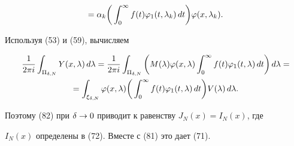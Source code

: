 \begin{pf}
\begin{multline*}
%


=\al _k\bigg(\int_0^\iy f(t)\vv_1(t,\la_k)\,dt\bigg)\vv(x,\la_k).


\end{multline*}


Используя (53) и (59), вычисляем


\begin{multline*}


\frac 1{2\pi i}\int_{\Pi_{\de,N}} Y(x,\la)\,d\la=


\frac 1{2\pi i}\int_{\Pi_{\de,N}}\bigg(M(\la)\vv(x,\la)


\int_0^\iy f(t)\vv_1(t,\la)\,dt\bigg)\,d\la = \\


%


=\int_{\xi_{\de,N}}


\vv(x,\la)\bigg(\int_0^\iy f(t)\vv_1(t,\la)\,dt\bigg)V(\la)\,d\la.


\end{multline*}


Поэтому (82) при $\delta\to 0$ приводит к равенству $J_N(x)=I_N(x)$, где


$I_N(x)$ определены в (72). Вместе с (81) это дает (71).


\end{pf}








